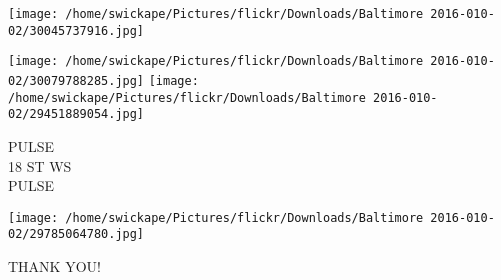 \documentclass[10pt,letterpaper]{article}
\begin{document}
\texttt{[image: /home/swickape/Pictures/flickr/Downloads/Baltimore 2016-010-02/30045737916.jpg]}

\vspace{0.25in}
\texttt{[image: /home/swickape/Pictures/flickr/Downloads/Baltimore 2016-010-02/30079788285.jpg]}
\texttt{[image: /home/swickape/Pictures/flickr/Downloads/Baltimore 2016-010-02/29451889054.jpg]}

PULSE\\
18 ST WS\\
PULSE\\
\pagebreak

\texttt{[image: /home/swickape/Pictures/flickr/Downloads/Baltimore 2016-010-02/29785064780.jpg]}

THANK YOU!\\
\pagebreak
\end{document}
